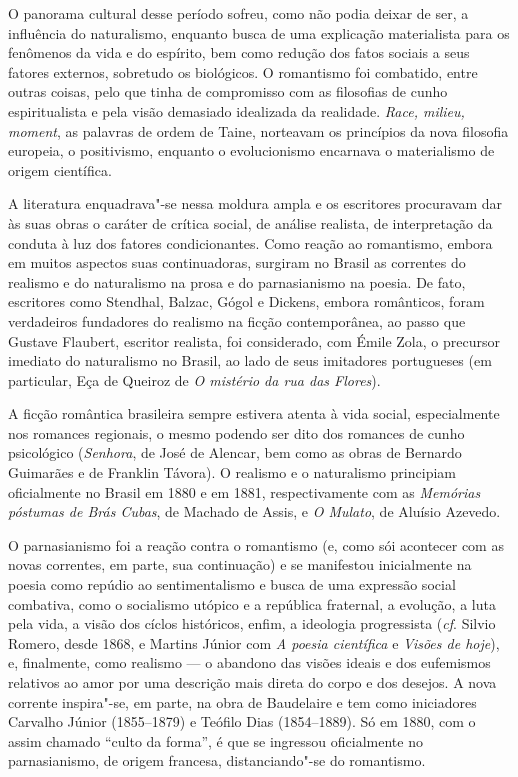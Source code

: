 O panorama cultural desse período sofreu, como não podia deixar de ser,
a influência do naturalismo, enquanto busca de uma explicação
materialista para os fenômenos da vida e do espírito, bem como redução
dos fatos sociais a seus fatores externos, sobretudo os biológicos. O
romantismo foi combatido, entre outras coisas, pelo que tinha de
compromisso com as filosofias de cunho espiritualista e pela visão
demasiado idealizada da realidade. \emph{Race, milieu, moment}, as
palavras de ordem de Taine, norteavam os princípios da nova filosofia
europeia, o positivismo, enquanto o evolucionismo encarnava o
materialismo de origem científica.

A literatura enquadrava"-se nessa moldura ampla e os escritores
procuravam dar às suas obras o caráter de crítica social, de análise
realista, de interpretação da conduta à luz dos fatores condicionantes.
Como reação ao romantismo, embora em muitos aspectos suas continuadoras,
surgiram no Brasil as correntes do realismo e do naturalismo na prosa e
do parnasianismo na poesia. De fato, escritores como Stendhal,
Balzac, Gógol e Dickens, embora românticos, foram
verdadeiros fundadores do realismo na ficção contemporânea, ao passo que
Gustave Flaubert, escritor realista, foi considerado, com Émile Zola, o
precursor imediato do naturalismo no Brasil, ao lado de seus imitadores
portugueses (em particular, Eça de Queiroz de \emph{O mistério da rua
das Flores}).

A ficção romântica brasileira sempre estivera atenta à vida social,
especialmente nos romances regionais, o mesmo podendo ser dito dos
romances de cunho psicológico (\emph{Senhora}, de José de Alencar, bem
como as obras de Bernardo Guimarães e de Franklin Távora). O realismo e
o naturalismo principiam oficialmente no Brasil em 1880 e em 1881,
respectivamente com as \emph{Memórias póstumas de Brás Cubas}, de
Machado de Assis, e \emph{O Mulato}, de Aluísio Azevedo.

O parnasianismo foi a reação contra o romantismo (e, como sói acontecer
com as novas correntes, em parte, sua continuação) e se manifestou
inicialmente na poesia como repúdio ao sentimentalismo e busca de uma
expressão social combativa, como o socialismo utópico e a república
fraternal, a evolução, a luta pela vida, a visão dos cíclos históricos,
enfim, a ideologia progressista (\emph{cf}. Silvio Romero, desde 1868, e
Martins Júnior com \emph{A poesia científica} e \emph{Visões de hoje}), e,
finalmente, como realismo --- o abandono das visões ideais e dos
eufemismos relativos ao amor por uma descrição mais direta do corpo e
dos desejos. A nova corrente inspira"-se, em parte, na obra de Baudelaire
e tem como iniciadores Carvalho Júnior (1855--1879) e Teófilo Dias
(1854--1889). Só em 1880, com o assim chamado ``culto da forma'', é que
se ingressou oficialmente no parnasianismo, de origem francesa,
distanciando"-se do romantismo.

